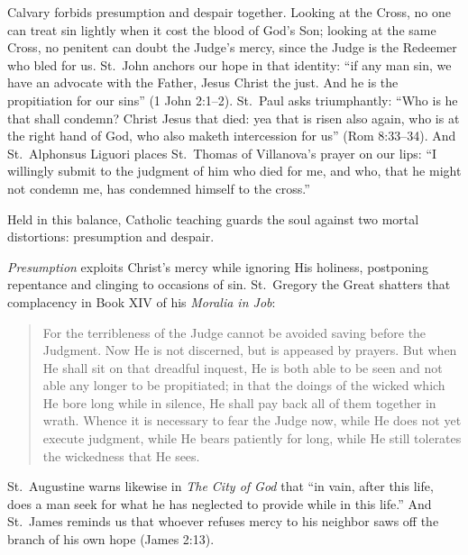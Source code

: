 Calvary forbids presumption and despair together. Looking at the Cross, no one can treat sin lightly when it cost the blood of God's Son; looking at the same Cross, no penitent can doubt the Judge's mercy, since the Judge is the Redeemer who bled for us. St.\ John anchors our hope in that identity: ``if any man sin, we have an advocate with the Father, Jesus Christ the just. And he is the propitiation for our sins'' (1 John 2:1--2). St.\ Paul asks triumphantly: ``Who is he that shall condemn? Christ Jesus that died: yea that is risen also again, who is at the right hand of God, who also maketh intercession for us'' (Rom 8:33--34). And St.\ Alphonsus Liguori places St.\ Thomas of Villanova's prayer on our lips: ``I willingly submit to the judgment of him who died for me, and who, that he might not condemn me, has condemned himself to the cross.''

Held in this balance, Catholic teaching guards the soul against two mortal distortions: presumption and despair.

\textit{Presumption} exploits Christ's mercy while ignoring His holiness, postponing repentance and clinging to occasions of sin. St.\ Gregory the Great shatters that complacency in Book XIV of his \textit{Moralia in Job}:

\begin{quote}
For the terribleness of the Judge cannot be avoided saving before the Judgment. Now He is not discerned, but is appeased by prayers. But when He shall sit on that dreadful inquest, He is both able to be seen and not able any longer to be propitiated; in that the doings of the wicked which He bore long while in silence, He shall pay back all of them together in wrath. Whence it is necessary to fear the Judge now, while He does not yet execute judgment, while He bears patiently for long, while He still tolerates the wickedness that He sees.
\end{quote}

St.\ Augustine warns likewise in \textit{The City of God} that ``in vain, after this life, does a man seek for what he has neglected to provide while in this life.'' And St.\ James reminds us that whoever refuses mercy to his neighbor saws off the branch of his own hope (James 2:13).

